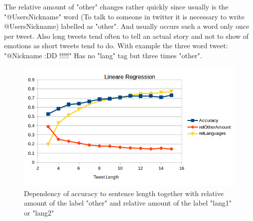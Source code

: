 The relative amount of "other" changes rather quickly since usually is the "@UsersNickname" word (To talk to someone in twitter it is necessary to write @UsersNickname) labelled as "other". And usually occurs such a word only once per tweet. Also long tweets tend often to tell an actual story and not to show of emotions as short tweets tend to do. With example the three word tweet: "@Nickname :DD !!!!!" Has no "lang" tag but three times "other". %
\begin{figure}[h]
\begin{center}
\includegraphics[scale = 0.6]{img/LinearRegressionGraf.png}
\caption{Dependency of accuracy to sentence length together with relative amount of the label "other" and relative amount of the label "lang1" or "lang2" }
\end{center} 
\label{fig:LRSentenceLength}
\end{figure}


